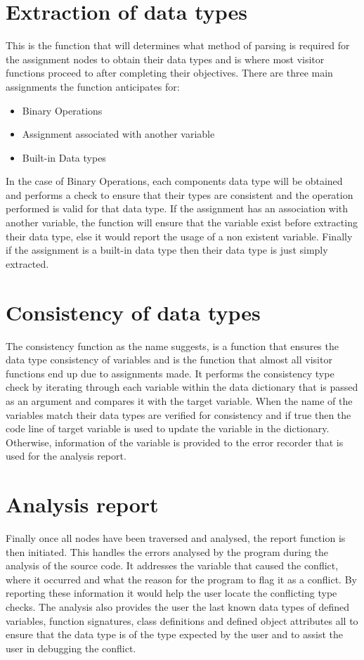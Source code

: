 \documentclass{l4proj}
\begin{document}
\section{Extraction of data types}
This is the function that will determines what method of parsing is required for the assignment nodes to obtain their data types and is where most visitor functions proceed to after completing their objectives. There are three main assignments the function anticipates for:

\begin{itemize}
    \item Binary Operations
    \item Assignment associated with another variable
    \item Built-in Data types
\end{itemize}


In the case of Binary Operations, each components data type will be obtained and performs a check to ensure that their types are consistent and the operation performed is valid for that data type. If the assignment has an association with another variable, the function will ensure that the variable exist before extracting their data type, else it would report the usage of a non existent variable. Finally if the assignment is a built-in data type then their data type is just simply extracted. 

\section{Consistency of data types}
The consistency function as the name suggests, is a function that ensures the data type consistency of variables and is the function that almost all visitor functions end up due to assignments made. It performs the consistency type check by iterating through each variable within the data dictionary that is passed as an argument and compares it with the target variable. When the name of the variables match their data types are verified for consistency and if true then the code line of target variable is used to update the variable in the dictionary. Otherwise, information of the variable is provided to the error recorder that is used for the analysis report.

\section{Analysis report}
Finally once all nodes have been traversed and analysed, the report function is then initiated. This handles the errors analysed by the program during the analysis of the source code. It addresses the variable that caused the conflict, where it occurred and what the reason for the program to flag it as a conflict. By reporting these information it would help the user locate the conflicting type checks. The analysis also provides the user the last known data types of defined variables, function signatures, class definitions and defined object attributes all to ensure that the data type is of the type expected by the user and to assist the user in debugging the conflict. 
\end{document}
